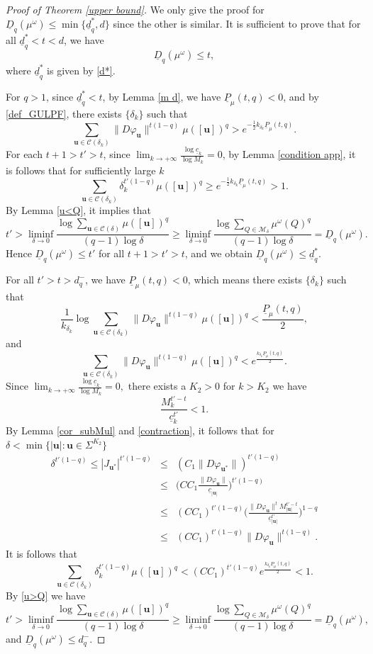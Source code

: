 \documentclass[12pt]{amsart}
\theoremstyle{plain}
\theoremstyle{definition}
\theoremstyle{remark}
\newcommand{\bu}{\mathbf{u}}
\begin{document}
\begin{proof}[Proof of Theorem \ref{upper bound}]
We only give the proof for $\underline{D}_q(\mu^\omega)\le\min\{\underline{d}_q^*, d\}$ since the other is similar. 
It is sufficient to prove that for all $\underline{d}_q^*<t<d$, we have
$$
\underline{D}_q(\mu^\omega)\le t,
$$
where $\underline{d}_q^*$ is given by \eqref{d*}.


For $q>1$, since $\underline{d}_q^*<t$, by Lemma \ref{m d},  we have $\underline P_\mu(t, q)<0$, and by \eqref{def_GULPF}, there exists $\{\delta_k\}$ such that
$$
\sum_{\mathbf{u}\in\mathcal{C}(\delta_k)}\|D\varphi_\mathbf{u}\|^{t(1-q)}\mu([\bu])^q>e^{-\frac{1}{2}k_{\delta_k} \underline P_\mu(t, q)}.
$$
 For each  $t+1>t'>t$, since $\lim_{k\to +\infty} \frac{\log\underline c_k}{\log M_k}=0$, by Lemma \ref{condition app}, it is follows that for sufficiently large $k$ 
$$
\sum_{\mathbf{u}\in\mathcal{C}(\delta_k)}\delta_k^{t'(1-q)}\mu([\bu])^q\ge e^{-\frac{1}{2}k_{\delta_k}\underline P_\mu(t, q)}>1.
$$
By Lemma \ref{u<Q}, it implies that 
$$
t'>\liminf_{\delta\to 0}\frac{\log \sum_{\mathbf{u}\in\mathcal{C}(\delta)}\mu([\bu])^q}{(q-1)\log \delta}\ge\liminf_{\delta\to 0}\frac{\log \sum_{Q\in{\mathcal{M}_\delta}}\mu^\omega(Q)^q}{(q-1)\log \delta}=\underline{D}_q(\mu^\omega).
$$
Hence  $\underline{D}_q(\mu^\omega)\le t'$  for all   $t+1>t'>t$, and we obtain  $\underline{D}_q(\mu^\omega)\le \underline{d}_q^*.$



\iffalse

For all $t'>t>d_q^-$, we have $\underline P_\mu(t, q)<0$, which means there exists $\{\delta_k\}$ such that
$$
\frac{1}{k_{\delta_k}}\log \sum_{\mathbf{u}\in\mathcal{C}(\delta_k)}\|D\varphi_\mathbf{u}\|^{t(1-q)}\mu([\bu])^q<\frac{\underline P_\mu(t, q)}{2},
$$
and
$$
\sum_{\mathbf{u}\in\mathcal{C}(\delta_k)}\|D\varphi_\mathbf{u}\|^{t(1-q)}\mu([\bu])^q<e^\frac{k_{\delta_k}  \underline P_\mu(t, q)}{2}.
$$
Since $\lim_{k\to +\infty} \frac{\log\underline c_k}{\log M_k}=0,$ there exists a $K_2>0$ for $k>K_2$ we have
$$
\frac{ M_k^{t'-t}}{\underline c_k^{t'}}<1.
$$
By Lemma \ref{cor_subMul} and \ref{contraction}, it follows that for $\delta<\min\{|\mathbf{u}|:\mathbf{u}\in\Sigma^{K_2}\}$
\begin{eqnarray*}
\delta^{t'(1-q)}\le|J_{\mathbf{u}^*}|^{t'(1-q)}&\le&(C_1\|D\varphi_{\mathbf{u}^*}\|)^{t'(1-q)}   \\
&\le&\big(CC_1\frac{\|D\varphi_\mathbf{u}\|}{\underline c_{|\mathbf{u}|}}\big)^{t'(1-q)}  \\
&\le&(CC_1)^{t'(1-q)}\big(\frac{\|D\varphi_\mathbf{u}\|^tM_{|\bu|}^{t'-t}}{\underline c_{|\mathbf{u}|}^{t'}}\big)^{1-q}   \\
&\le&(CC_1)^{t'(1-q)}\|D\varphi_\mathbf{u}\|^{t(1-q)}.
\end{eqnarray*}
It is follows that
$$
\sum_{\mathbf{u}\in\mathcal{C}(\delta_k)}\delta_k^{t'(1-q)}\mu([\bu])^q< (CC_1)^{t'(1-q)}e^\frac{k_{\delta_k}  \underline P_\mu(t, q)}{2}<1.
$$
By \eqref{u>Q} we have
$$
t'>\liminf_{\delta\to 0}\frac{\log \sum_{\mathbf{u}\in\mathcal{C}(\delta)}\mu([\bu])^q}{(q-1)\log \delta}\ge\liminf_{\delta\to 0}\frac{\log \sum_{Q\in{\mathcal{M}_\delta}}\mu^\omega(Q)^q}{(q-1)\log \delta}=\underline{D}_q(\mu^\omega),
$$
and $\underline{D}_q(\mu^\omega)\le d_q^-.$


\end{proof}
\end{document}
